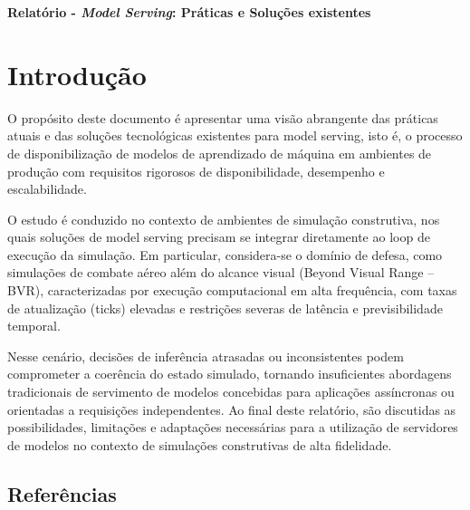\begin{center}
    \textbf{\Huge{Relatório - \emph{Model Serving}: Práticas e Soluções existentes}}
\end{center}

\section{Introdução}

O propósito deste documento é apresentar uma visão abrangente das práticas atuais e das soluções tecnológicas existentes para model serving, isto é, o processo de disponibilização de modelos de aprendizado de máquina em ambientes de produção com requisitos rigorosos de disponibilidade, desempenho e escalabilidade.

O estudo é conduzido no contexto de ambientes de simulação construtiva, nos quais soluções de model serving precisam se integrar diretamente ao loop de execução da simulação. Em particular, considera-se o domínio de defesa, como simulações de combate aéreo além do alcance visual (Beyond Visual Range – BVR), caracterizadas por execução computacional em alta frequência, com taxas de atualização (ticks) elevadas e restrições severas de latência e previsibilidade temporal.

Nesse cenário, decisões de inferência atrasadas ou inconsistentes podem comprometer a coerência do estado simulado, tornando insuficientes abordagens tradicionais de servimento de modelos concebidas para aplicações assíncronas ou orientadas a requisições independentes. Ao final deste relatório, são discutidas as possibilidades, limitações e adaptações necessárias para a utilização de servidores de modelos no contexto de simulações construtivas de alta fidelidade.

\subsection{Referências}

